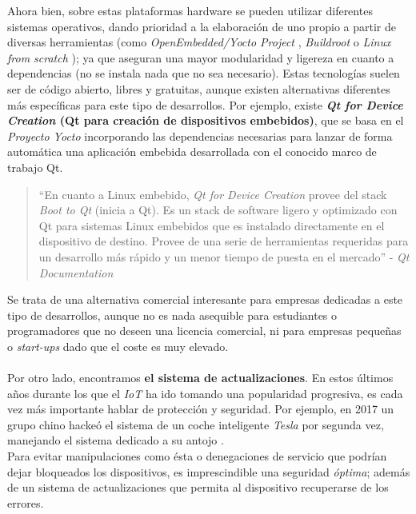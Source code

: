 Ahora bien, sobre estas plataformas hardware se pueden utilizar diferentes sistemas operativos, dando prioridad a la elaboración de uno propio a partir de diversas herramientas (como \textit{OpenEmbedded/Yocto Project} \cite{yocto-project}, \textit{Buildroot} \cite{buildroot} o \textit{Linux from scratch} \cite{linux-from-scratch}); ya que aseguran una mayor modularidad y ligereza en cuanto a dependencias (no se instala nada que no sea necesario). Estas tecnologías suelen ser de código abierto, libres y gratuitas, aunque existen alternativas diferentes más específicas para este tipo de desarrollos. Por ejemplo, existe \textbf{\textit{Qt for Device Creation} (Qt para creación de dispositivos embebidos)}, que se basa en el \textit{Proyecto Yocto} incorporando las dependencias necesarias para lanzar de forma automática una aplicación embebida desarrollada con el conocido marco de trabajo Qt.

\begin{quotation}
	``En cuanto a Linux embebido, \textit{Qt for Device Creation} provee del stack \textit{Boot to Qt} (inicia a Qt). Es un stack de software ligero y optimizado con Qt para sistemas Linux embebidos que es instalado directamente en el dispositivo de destino. Provee de una serie de herramientas requeridas para un desarrollo más rápido y un menor tiempo de puesta en el mercado'' - \textit{Qt Documentation} \cite{qt-device-creation}
\end{quotation}

Se trata de una alternativa comercial interesante para empresas dedicadas a este tipo de desarrollos, aunque no es nada asequible para estudiantes o programadores que no deseen una licencia comercial, ni para empresas pequeñas o \textit{start-ups} dado que el coste es muy elevado.\\

\noindent\makebox[\linewidth]{\rule{\textwidth}{0.4pt}}\\

Por otro lado, encontramos \textbf{el sistema de actualizaciones}. En estos últimos años durante los que el \textit{IoT} ha ido tomando una popularidad progresiva, es cada vez más importante hablar de protección y seguridad. Por ejemplo, en 2017 un grupo chino hackeó el sistema de un coche inteligente \textit{Tesla} por segunda vez, manejando el sistema dedicado a su antojo \cite{tesla-system-hacked}.\\

Para evitar manipulaciones como ésta o denegaciones de servicio que podrían dejar bloqueados los dispositivos, es imprescindible una seguridad \textit{óptima}; además de un sistema de actualizaciones que permita al dispositivo recuperarse de los errores.\\

